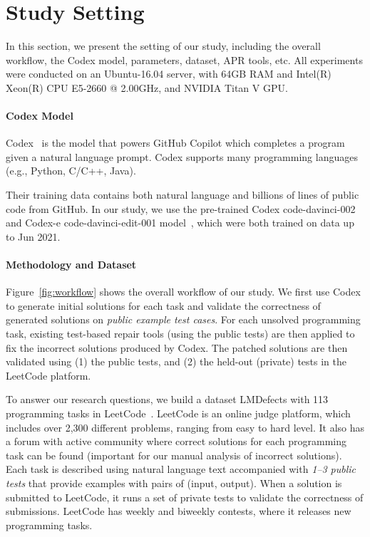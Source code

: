  

\section{Study Setting} In this section, we present the setting of our study, including the overall workflow, the Codex model, parameters, dataset, APR tools, etc. All experiments were conducted on an Ubuntu-16.04 server, with 64GB RAM and Intel(R) Xeon(R) CPU E5-2660 @ 2.00GHz, and NVIDIA Titan V GPU.

\paragraph{\textbf{Codex Model}}

Codex~\cite{codex} is the model that powers GitHub Copilot \cite{copilot} which completes a program given a natural language prompt. Codex supports many programming languages (e.g., Python, C/C++, Java).

Their training data contains both natural language and billions of lines of public code from GitHub. In our study, we use the pre-trained Codex code-davinci-002 and Codex-e code-davinci-edit-001 model~\cite{codexmodel}, which were both trained on data up to Jun 2021.

\paragraph{\textbf{Methodology and Dataset}}

Figure~\ref{fig:workflow} shows the overall workflow of our study. We first use Codex to generate initial solutions for each task and validate the correctness of generated solutions on {\em public example test cases}. For each unsolved programming task, existing test-based repair tools (using the public tests) are then applied to fix the incorrect solutions produced by Codex. The patched solutions are then validated using (1) the public tests, and (2) the held-out (private) tests in the LeetCode platform.

To answer our research questions, we build a dataset LMDefects with 113 programming tasks in LeetCode~\cite{leetcode}. LeetCode is an online judge platform, which includes over 2,300 different problems, ranging from easy to hard level. It also has a forum \cite{Leetforum} with active community where correct solutions for each programming task can be found (important for our manual analysis of incorrect solutions). Each task is described using natural language text accompanied with {\em  1--3 public tests} that provide examples with pairs of (input, output). When a solution is submitted to LeetCode, it runs a set of private tests to validate the correctness of submissions. LeetCode has weekly and biweekly contests, where it releases new programming tasks.

